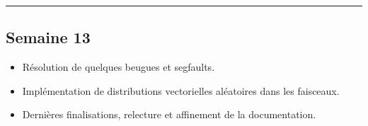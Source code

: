 \documentclass[12pt, letterpaper, twoside]{article}
\begin{document}
\rule{\textwidth}{0.4pt}

\subsection*{Semaine 13}
\begin{itemize}
	\item Résolution de quelques beugues et segfaults.
	\item Implémentation de distributions vectorielles aléatoires dans les faisceaux.
	\item Dernières finalisations, relecture et affinement de la documentation.
\end{itemize}
\end{document}
